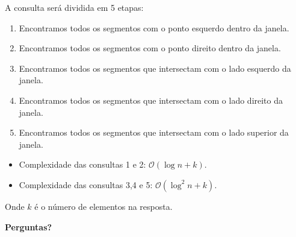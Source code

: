 \documentclass[
paper=128mm:96mm, %
fontsize=11pt, %
pagesize, %
parskip=half-, %
]{scrartcl} %
\theoremstyle{mythmstyle} %
\begin{document}
\clearpage
\begin{flushleft}
  A consulta será dividida em 5 etapas:\\
  \small  
  \begin{enumerate}
  \item Encontramos todos os segmentos com o ponto esquerdo dentro da janela.
  \item Encontramos todos os segmentos com o ponto direito dentro da janela.
  \item Encontramos todos os segmentos que intersectam com o lado esquerdo da janela.
  \item Encontramos todos os segmentos que intersectam com o lado direito da janela.
  \item Encontramos todos os segmentos que intersectam com o lado superior da janela.
  \end{enumerate}
\end{flushleft}
\clearpage
\clearpage
  \begin{itemize}
  \item Complexidade das consultas 1 e 2: $\mathcal{O}(\log n + k)$.
  \item Complexidade das consultas 3,4 e 5: $\mathcal{O}(\log^2 n + k)$.\\
  \end{itemize}
  Onde $k$ é o número de elementos na resposta.

\clearpage
\clearpage
\thispagestyle{empty} %
\printbibliography

\clearpage
\clearpage

\thispagestyle{empty} %

\begin{flushright}
\vspace{0.6cm}
\color{white}\sffamily
{\bfseries\Huge Perguntas?\par} %
\vfill
\end{flushright}
\end{document}
